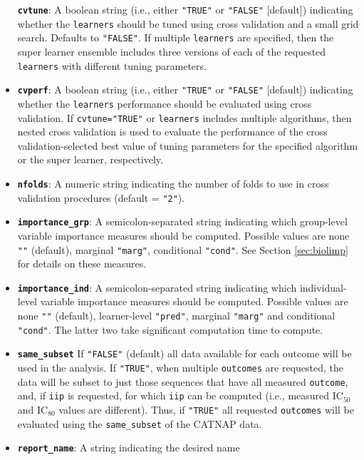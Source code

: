 \documentclass[]{article}
\begin{document}
\begin{itemize}
  \textbf{\texttt{cvtune}}: A boolean string (i.e., either
  \texttt{"TRUE"} or \texttt{"FALSE"} {[}default{]}) indicating whether
  the \texttt{learners} should be tuned using cross validation and a
  small grid search. Defaults to \texttt{"FALSE"}. If multiple
  \texttt{learners} are specified, then the super learner ensemble
  includes three versions of each of the requested \texttt{learners}
  with different tuning parameters.
\item
  \textbf{\texttt{cvperf}}: A boolean string (i.e., either
  \texttt{"TRUE"} or \texttt{"FALSE"} {[}default{]}) indicating whether
  the \texttt{learners} performance should be evaluated using cross
  validation. If \texttt{cvtune="TRUE"} or \texttt{learners} includes
  multiple algorithms, then nested cross validation is used to evaluate
  the performance of the cross validation-selected best value of tuning
  parameters for the specified algorithm or the super learner,
  respectively.
\item
  \textbf{\texttt{nfolds}}: A numeric string indicating the number of
  folds to use in cross validation procedures (default = \texttt{"2"}).
\item
  \textbf{\texttt{importance\_grp}}: A semicolon-separated string
  indicating which group-level variable importance measures should be
  computed. Possible values are none \texttt{""} (default), marginal
  \texttt{"marg"}, conditional \texttt{"cond"}. See Section
  \ref{sec:biolimp} for details on these measures.
\item
  \textbf{\texttt{importance\_ind}}: A semicolon-separated string
  indicating which individual-level variable importance measures should
  be computed. Possible values are none \texttt{""} (default),
  learner-level \texttt{"pred"}, marginal \texttt{"marg"} and
  conditional \texttt{"cond"}. The latter two take significant
  computation time to compute.
\item
  \textbf{\texttt{same\_subset}} If \texttt{"FALSE"} (default) all data
  available for each outcome will be used in the analysis. If
  \texttt{"TRUE"}, when multiple \texttt{outcomes} are requested, the
  data will be subset to just those sequences that have all measured
  \texttt{outcome}, and, if \texttt{iip} is requested, for which
  \texttt{iip} can be computed (i.e., measured IC\(_{50}\) and
  IC\(_{80}\) values are different). Thus, if \texttt{"TRUE"} all
  requested \texttt{outcomes} will be evaluated using the
  \texttt{same\_subset} of the CATNAP data.
\item
  \textbf{\texttt{report\_name}}: A string indicating the desired name

\end{itemize}
\end{document}
